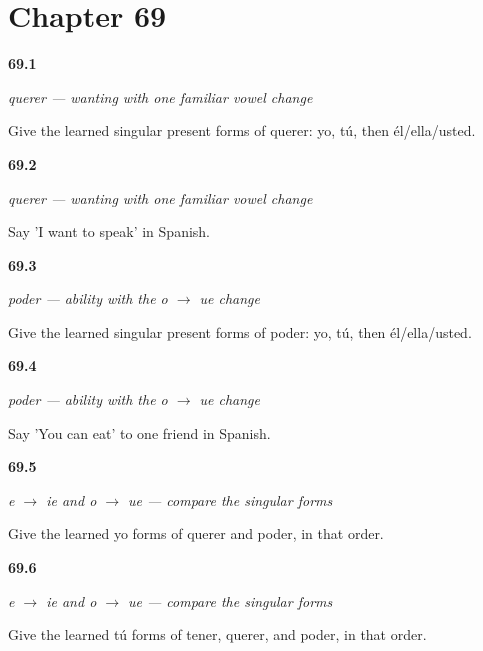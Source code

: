 \section*{Chapter 69}

\noindent\begin{minipage}[t]{\linewidth}
\raggedright
\hypertarget{review-ES-C11-querer-singular-forms}{\textbf{69.1}} \emph{querer — wanting with one familiar vowel change}\par
\small Give the learned singular present forms of querer: yo, tú, then él/ella/usted.
\end{minipage}\par\medskip

\noindent\begin{minipage}[t]{\linewidth}
\raggedright
\hypertarget{review-ES-C11-querer-want-to-speak}{\textbf{69.2}} \emph{querer — wanting with one familiar vowel change}\par
\small Say 'I want to speak' in Spanish.
\end{minipage}\par\medskip

\noindent\begin{minipage}[t]{\linewidth}
\raggedright
\hypertarget{review-ES-C11-poder-singular-forms}{\textbf{69.3}} \emph{poder — ability with the o $\to$ ue change}\par
\small Give the learned singular present forms of poder: yo, tú, then él/ella/usted.
\end{minipage}\par\medskip

\noindent\begin{minipage}[t]{\linewidth}
\raggedright
\hypertarget{review-ES-C11-poder-can-eat}{\textbf{69.4}} \emph{poder — ability with the o $\to$ ue change}\par
\small Say 'You can eat' to one friend in Spanish.
\end{minipage}\par\medskip

\noindent\begin{minipage}[t]{\linewidth}
\raggedright
\hypertarget{review-ES-C11-stem-changes-yo-contrast}{\textbf{69.5}} \emph{e $\to$ ie and o $\to$ ue — compare the singular forms}\par
\small Give the learned yo forms of querer and poder, in that order.
\end{minipage}\par\medskip

\noindent\begin{minipage}[t]{\linewidth}
\raggedright
\hypertarget{review-ES-C11-stem-changes-tu-contrast}{\textbf{69.6}} \emph{e $\to$ ie and o $\to$ ue — compare the singular forms}\par
\small Give the learned tú forms of tener, querer, and poder, in that order.
\end{minipage}\par\medskip

